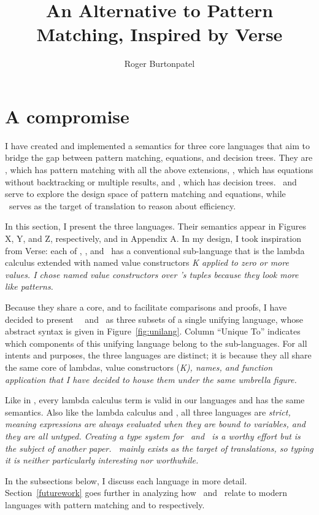 \documentclass[manuscript,screen,review, 12pt, nonacm]{acmart}
\title{An Alternative to Pattern Matching, Inspired by Verse}
\author{Roger Burtonpatel}
\affiliation{%
\institution{Tufts University}
\streetaddress{419 Boston Ave}
  \city{Medford}
  \state{Massachusetts}
  \country{USA}
  \postcode{02155}
  }
\begin{document}
  
\section{A compromise}
    I have created and implemented a semantics for three core languages that aim
    to bridge the gap between pattern matching, equations, and decision trees.
    They are \PPlus, which has pattern matching with all the above extensions,
    \VMinus, which has equations without backtracking or multiple results, and
    \D, which has decision trees. \PPlus\ and \VMinus serve to explore the
    design space of pattern matching and equations, while \D\ serves as the
    target of translation to reason about efficiency. 

    In this section, I present the three languages. Their semantics appear in
    Figures X, Y, and Z, respectively, and in Appendix A. In my design, I took
    inspiration from Verse: each of \PPlus, \VMinus, and \D\ has a conventional
    sub-language that is the lambda calculus extended with named value
    constructors \it{K} applied to zero or more values. I chose named value
    constructors over \VC's tuples because they look more like patterns. 
    
    Because they share a core, and to facilitate comparisons and proofs, I have
    decided to present \VMinus\, \PPlus\, and \D\ as three subsets of a single
    unifying language, whose abstract syntax is given in
    Figure~\ref{fig:unilang}. Column “Unique To” indicates which components of
    this unifying language belong to the sub-languages. For all intents and
    purposes, the three languages are distinct; it is because they all share the
    same core of lambdas, value constructors (\it{K}), names, and function
    application that I have decided to house them under the same umbrella
    figure. 
    
    Like in \VC, every lambda calculus term is valid in our languages and has
    the same semantics. Also like the lambda calculus and \VC, all three
    languages are \it{strict}, meaning expressions are always evaluated when
    they are bound to variables, and they are all untyped. Creating a type
    system for \PPlus\ and \VMinus\ is a worthy effort but is the subject of
    another paper. \D\ mainly exists as the target of translations, so typing it
    is neither particularly interesting nor worthwhile. 
    
    In the subsections below, I discuss each language in more detail.
    Section~\ref{futurework} goes further in analyzing how \PPlus\ and \VMinus\
    relate to modern languages with pattern matching and to \VC respectively. 
\end{document}
